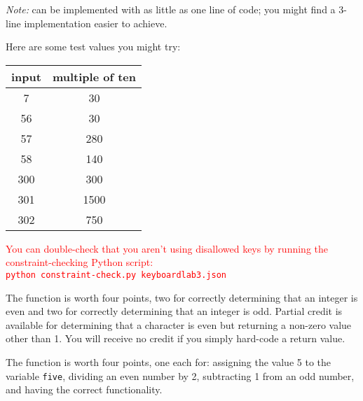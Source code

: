 \textit{Note: }  can be implemented with as little as one line of code;
you might find a 3-line implementation easier to achieve.

\begin{description}
\end{description}
Here are some test values you might try:

\begin{center}
    \begin{tabular}{cc}
        input   & multiple of ten \\ \hline
        7       & 30    \\
        56      & 30    \\
        57      & 280   \\
        58      & 140   \\
        300     & 300   \\
        301     & 1500  \\
        302     & 750   \\
    \end{tabular}
\end{center}

\textcolor{red}{
You can double-check that you aren't using disallowed keys by running the constraint-checking Python script: \\
\texttt{python constraint-check.py keyboardlab3.json}
}

The  function is worth four points, two for correctly determining that an integer is even and  two for correctly determining that an integer is odd.
Partial credit is available for determining that a character is even but returning a non-zero value other than 1.
You will receive no credit if you simply hard-code a return value.

The  function is worth four points, one each for: assigning the value 5 to the variable \lstinline{five}, dividing an even number by 2, subtracting 1 from an odd number, and having the correct functionality.
